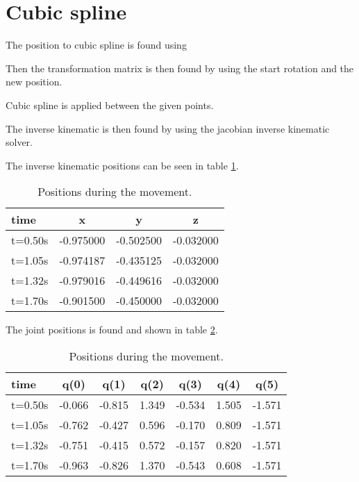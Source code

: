 \section{Cubic spline}

The position to cubic spline is found using \cite[equation 5.23]{book:roboticNotes}

Then the transformation matrix is then found by using the start rotation and the new position.

Cubic spline is applied between the given points.

The inverse kinematic is then found by using the jacobian inverse kinematic solver.

The inverse kinematic positions can be seen in table \ref{tb:positions}.

\begin{table}[h]
\centering
\begin{tabular}{l|*{3}{c} }
 time    & x         & y         & z         \\ \hline       
 t=0.50s & -0.975000 & -0.502500 & -0.032000 \\
 t=1.05s & -0.974187 & -0.435125 & -0.032000 \\
 t=1.32s & -0.979016 & -0.449616 & -0.032000 \\
 t=1.70s & -0.901500 & -0.450000 & -0.032000 \\
\end{tabular}
\caption{Positions during the movement.}
\label{tb:positions}
\end{table}

The joint positions is found and shown in table \ref{tb:joint_positions}.

\begin{table}[h]
\centering
\begin{tabular}{l|*{6}{c} }
 time    & q(0)   & q(1)   & q(2)  & q(3)   & q(4)  & q(5)   \\ \hline       
 t=0.50s & -0.066 & -0.815 & 1.349 & -0.534 & 1.505 & -1.571 \\
 t=1.05s & -0.762 & -0.427 & 0.596 & -0.170 & 0.809 & -1.571 \\
 t=1.32s & -0.751 & -0.415 & 0.572 & -0.157 & 0.820 & -1.571 \\
 t=1.70s & -0.963 & -0.826 & 1.370 & -0.543 & 0.608 & -1.571 \\
\end{tabular}
\caption{Positions during the movement.}
\label{tb:joint_positions}
\end{table}

